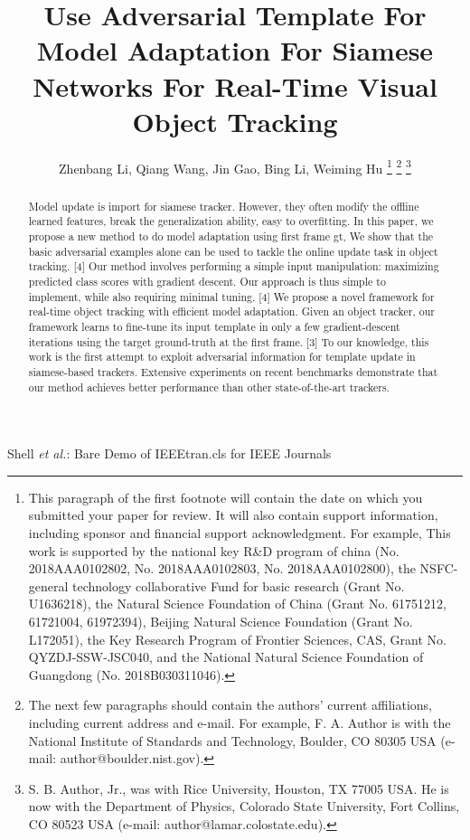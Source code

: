 \documentclass[journal]{IEEEtran}
\begin{document}
\title{Use Adversarial Template For Model Adaptation For Siamese Networks For Real-Time Visual Object Tracking}

\author{Zhenbang Li, Qiang Wang, Jin Gao, Bing Li, Weiming Hu
\thanks{This paragraph of the first footnote will contain the date on which you submitted your paper for review. It will also contain support information, including sponsor and financial support acknowledgment. For example, This work is supported by the national key R\&D program of china (No. 2018AAA0102802, No. 2018AAA0102803, No. 2018AAA0102800), the NSFC-general technology collaborative Fund for basic research (Grant No. U1636218), the Natural Science Foundation of China (Grant No. 61751212, 61721004, 61972394), Beijing Natural Science Foundation (Grant No. L172051), the Key Research Program of Frontier Sciences, CAS, Grant No. QYZDJ-SSW-JSC040, and the National Natural Science Foundation of Guangdong (No. 2018B030311046).}
\thanks{The next few paragraphs should contain the authors' current affiliations, including current address and e-mail. For example, F. A. Author is with the National Institute of Standards and Technology, Boulder, CO 80305 USA (e-mail: author@boulder.nist.gov).}
\thanks{S. B. Author, Jr., was with Rice University, Houston, TX 77005 USA. He is now with the Department of Physics, Colorado State University, Fort Collins, CO 80523 USA (e-mail: author@lamar.colostate.edu).}}

{Shell \MakeLowercase{\textit{et al.}}: Bare Demo of IEEEtran.cls for IEEE Journals}
\maketitle

\begin{abstract}
Model update is import for siamese tracker. However, they often modify the offline learned features, break the generalization ability, easy to overfitting. In this paper, we propose a new method to do model adaptation using first frame gt, 
We show that the basic adversarial examples alone can be used to tackle the online update task in object tracking. [4]
Our method involves performing a simple input manipulation: maximizing predicted class scores with gradient descent. Our approach is thus simple to implement, while also requiring minimal tuning. [4]
We propose a novel framework for real-time object tracking with efficient model adaptation. Given an object tracker, our framework learns to fine-tune its input template in only a few gradient-descent iterations using the target ground-truth at the first frame. [3]
To our knowledge, this work is the first attempt to exploit adversarial information for template update in siamese-based trackers. Extensive experiments on recent benchmarks demonstrate that our method achieves better performance than other state-of-the-art trackers.
\end{abstract}
\end{document}
